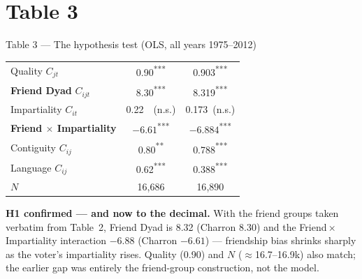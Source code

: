 \documentclass[aspectratio=169,10pt]{beamer}
\newcommand{\paper}[1]{{\color{papercol}#1}}
\newcommand{\rep}[1]{{\color{repcol}#1}}
\newcommand{\pstar}[1]{{\color{papercol}\textsuperscript{#1}}}
\newcommand{\rstar}[1]{{\color{repcol}\textsuperscript{#1}}}
\newcommand{\phead}[1]{\cellcolor{papercol!12}\paper{\textbf{#1}}}
\newcommand{\rhead}[1]{\cellcolor{repcol!12}\rep{\textbf{#1}}}
\begin{document}
\section{Table 3}
\begin{frame}{Table 3 --- The hypothesis test (OLS, all years 1975--2012)}
  \centering\small
  \renewcommand{\arraystretch}{1.25}
  \begin{tabular}{@{}l c c@{}}
    \toprule
    & \phead{Charron M1} & \rhead{Replication M1}\\
    \midrule
    Quality $C_{jt}$                 & 0.90\pstar{***}  & 0.903\rstar{***}\\
    \textbf{Friend Dyad} $C_{ijt}$   & 8.30\pstar{***}  & 8.319\rstar{***}\\
    Impartiality $C_{it}$            & 0.22\ \ (n.s.)   & 0.173\ (n.s.)\\
    \rowcolor{yellow!25}
    \textbf{Friend $\times$ Impartiality} & $-6.61$\pstar{***} & $-6.884$\rstar{***}\\
    Contiguity $C_{ij}$              & 0.80\pstar{**}   & 0.788\rstar{***}\\
    Language $C_{ij}$                & 0.62\pstar{***}  & 0.388\rstar{***}\\
    \midrule
    $N$                              & 16{,}686         & 16{,}890\\
    \bottomrule
  \end{tabular}

  \vspace{6pt}
  \footnotesize
  \textbf{H1 confirmed --- and now to the decimal.} With the friend groups taken
  verbatim from Table~2, Friend Dyad is \rep{8.32} (Charron \paper{8.30}) and the
  \colorbox{yellow!25}{Friend\,$\times$\,Impartiality} interaction \rep{$-6.88$}
  (Charron \paper{$-6.61$}) --- friendship bias shrinks sharply as the voter's
  impartiality rises. Quality (0.90) and $N$ ($\approx$16.7--16.9k) also match; the
  earlier gap was entirely the friend-group construction, not the model.
\end{frame}
\end{document}
